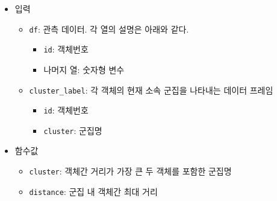 \documentclass[]{book}
\providecommand{\tightlist}{%
  \setlength{\itemsep}{0pt}\setlength{\parskip}{0pt}}
\begin{document}
\begin{itemize}
\tightlist
\item
  입력

  \begin{itemize}
  \tightlist
  \item
    \texttt{df}: 관측 데이터. 각 열의 설명은 아래와 같다.

    \begin{itemize}
    \tightlist
    \item
      \texttt{id}: 객체번호
    \item
      나머지 열: 숫자형 변수
    \end{itemize}
  \item
    \texttt{cluster\_label}: 각 객체의 현재 소속 군집을 나타내는 데이터 프레임

    \begin{itemize}
    \tightlist
    \item
      \texttt{id}: 객체번호
    \item
      \texttt{cluster}: 군집명
    \end{itemize}
  \end{itemize}
\item
  함수값

  \begin{itemize}
  \tightlist
  \item
    \texttt{cluster}: 객체간 거리가 가장 큰 두 객체를 포함한 군집명
  \item
    \texttt{distance}: 군집 내 객체간 최대 거리
  \end{itemize}
\end{itemize}
\end{document}
